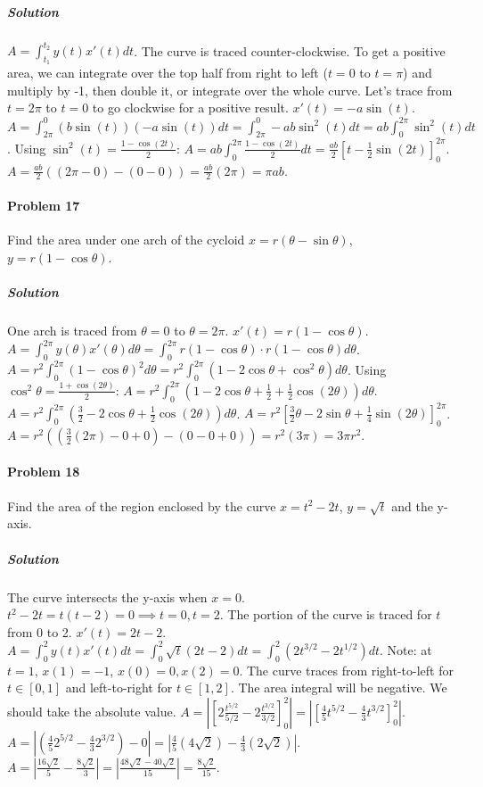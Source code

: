 \documentclass{article}
\begin{document}
\subparagraph{Solution}
$A = \int_{t_1}^{t_2} y(t) x'(t) dt$.
The curve is traced counter-clockwise. To get a positive area, we can integrate over the top half from right to left ($t=0$ to $t=\pi$) and multiply by -1, then double it, or integrate over the whole curve. Let's trace from $t=2\pi$ to $t=0$ to go clockwise for a positive result.
$x'(t) = -a\sin(t)$.
$A = \int_{2\pi}^0 (b\sin(t))(-a\sin(t)) dt = \int_{2\pi}^0 -ab\sin^2(t) dt = ab\int_0^{2\pi} \sin^2(t) dt$.
Using $\sin^2(t) = \frac{1-\cos(2t)}{2}$:
$A = ab \int_0^{2\pi} \frac{1-\cos(2t)}{2} dt = \frac{ab}{2} \left[ t - \frac{1}{2}\sin(2t) \right]_0^{2\pi}$.
$A = \frac{ab}{2} ((2\pi - 0) - (0 - 0)) = \frac{ab}{2}(2\pi) = \pi ab$.

\paragraph{Problem 17}
Find the area under one arch of the cycloid $x=r(\theta-\sin\theta)$, $y=r(1-\cos\theta)$.

\subparagraph{Solution}
One arch is traced from $\theta=0$ to $\theta=2\pi$.
$x'(t) = r(1-\cos\theta)$.
$A = \int_0^{2\pi} y(\theta)x'(\theta) d\theta = \int_0^{2\pi} r(1-\cos\theta) \cdot r(1-\cos\theta) d\theta$.
$A = r^2 \int_0^{2\pi} (1-\cos\theta)^2 d\theta = r^2 \int_0^{2\pi} (1 - 2\cos\theta + \cos^2\theta) d\theta$.
Using $\cos^2\theta = \frac{1+\cos(2\theta)}{2}$:
$A = r^2 \int_0^{2\pi} (1 - 2\cos\theta + \frac{1}{2} + \frac{1}{2}\cos(2\theta)) d\theta$.
$A = r^2 \int_0^{2\pi} (\frac{3}{2} - 2\cos\theta + \frac{1}{2}\cos(2\theta)) d\theta$.
$A = r^2 \left[ \frac{3}{2}\theta - 2\sin\theta + \frac{1}{4}\sin(2\theta) \right]_0^{2\pi}$.
$A = r^2 ((\frac{3}{2}(2\pi) - 0 + 0) - (0 - 0 + 0)) = r^2(3\pi) = 3\pi r^2$.

\paragraph{Problem 18}
Find the area of the region enclosed by the curve $x=t^2-2t$, $y=\sqrt{t}$ and the y-axis.

\subparagraph{Solution}
The curve intersects the y-axis when $x=0$.
$t^2 - 2t = t(t-2) = 0 \implies t=0, t=2$.
The portion of the curve is traced for $t$ from 0 to 2.
$x'(t) = 2t-2$.
$A = \int_{0}^{2} y(t)x'(t) dt = \int_{0}^{2} \sqrt{t}(2t-2) dt = \int_{0}^{2} (2t^{3/2} - 2t^{1/2}) dt$.
Note: at $t=1$, $x(1)=-1$, $x(0)=0, x(2)=0$. The curve traces from right-to-left for $t \in [0,1]$ and left-to-right for $t \in [1,2]$. The area integral will be negative. We should take the absolute value.
$A = \left| \left[ 2\frac{t^{5/2}}{5/2} - 2\frac{t^{3/2}}{3/2} \right]_0^2 \right| = \left| \left[ \frac{4}{5}t^{5/2} - \frac{4}{3}t^{3/2} \right]_0^2 \right|$.
$A = \left| (\frac{4}{5}2^{5/2} - \frac{4}{3}2^{3/2}) - 0 \right| = \left| \frac{4}{5}(4\sqrt{2}) - \frac{4}{3}(2\sqrt{2}) \right|$.
$A = \left| \frac{16\sqrt{2}}{5} - \frac{8\sqrt{2}}{3} \right| = \left| \frac{48\sqrt{2} - 40\sqrt{2}}{15} \right| = \frac{8\sqrt{2}}{15}$.
\end{document}
